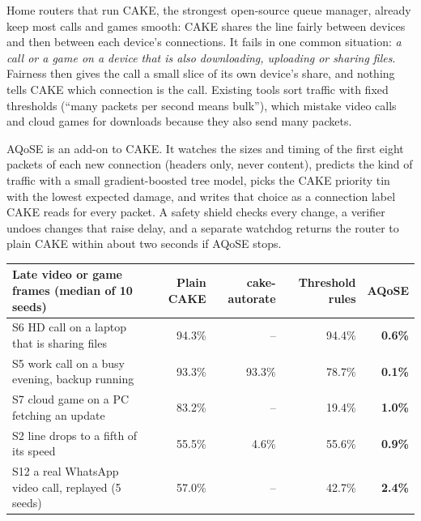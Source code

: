 \documentclass[11pt,a4paper]{article}
\newcommand{\ours}[1]{\textbf{\color{aq}#1}}
\begin{document}
Home routers that run CAKE, the strongest open-source queue manager, already keep most calls and games smooth: CAKE shares the line fairly between devices and then between each device's connections. It fails in one common situation: \emph{a call or a game on a device that is also downloading, uploading or sharing files}. Fairness then gives the call a small slice of its own device's share, and nothing tells CAKE which connection is the call. Existing tools sort traffic with fixed thresholds (``many packets per second means bulk''), which mistake video calls and cloud games for downloads because they also send many packets.

AQoSE is an add-on to CAKE. It watches the sizes and timing of the first eight packets of each new connection (headers only, never content), predicts the kind of traffic with a small gradient-boosted tree model, picks the CAKE priority tin with the lowest expected damage, and writes that choice as a connection label CAKE reads for every packet. A safety shield checks every change, a verifier undoes changes that raise delay, and a separate watchdog returns the router to plain CAKE within about two seconds if AQoSE stops.

\begin{table}[H]\centering\small
\begin{tabular}{@{}lrrrr@{}}
\toprule
Late video or game frames (median of 10 seeds) & Plain CAKE & cake-autorate & Threshold rules & \textbf{AQoSE} \\
\midrule
S6 HD call on a laptop that is sharing files & 94.3\% & -- & 94.4\% & \ours{0.6\%} \\
S5 work call on a busy evening, backup running & 93.3\% & 93.3\% & 78.7\% & \ours{0.1\%} \\
S7 cloud game on a PC fetching an update & 83.2\% & -- & 19.4\% & \ours{1.0\%} \\
S2 line drops to a fifth of its speed & 55.5\% & 4.6\% & 55.6\% & \ours{0.9\%} \\
S12 a real WhatsApp video call, replayed (5 seeds) & 57.0\% & -- & 42.7\% & \ours{2.4\%} \\
\bottomrule
\end{tabular}
\end{table}
\end{document}
